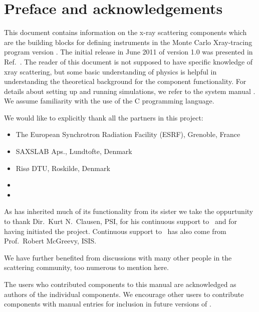 
\chapter*{Preface and acknowledgements}
This document contains information on the x-ray scattering components
which are the building blocks for defining instruments
in the Monte Carlo Xray-tracing program \MCX version \version . The initial
release in June 2011 of version 1.0 was presented in Ref.~\cite{nn_10_20}.
The reader of this
document is not supposed to have specific knowledge of xray scattering,
but some basic understanding of physics is helpful in
understanding the theoretical background for the component functionality.
For details about setting up and running simulations, we refer to
the \MCX system manual \cite{mcxtracemanual}.
We assume familiarity with the use of
the C programming language.

We would like to explicitly thank all the partners in this project:
\begin{itemize}
\item The European Synchrotron Radiation Facility (ESRF), Grenoble, France
\item SAXSLAB Aps., Lundtofte, Denmark
\item Risø DTU, Roskilde, Denmark
\item \NBIlong
\item \Lifelong
\end{itemize}

As
\MCX has inherited much of its functionality from its sister \MCS we take the oppurtunity to thank 
Dir.~Kurt N.~Clausen, PSI, for his continuous
support to \MCS\ and for having initiated the project.
Continuous support to \MCS\ has also come from Prof.~Robert McGreevy, ISIS.

We have further benefited
from discussions with many other people in the scattering
community, too numerous to mention here.

The users who contributed components to this manual are acknowledged
as authors of the individual components. We encourage other
users to contribute components with manual entries for inclusion in
future versions of \MCX.

